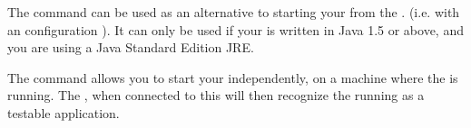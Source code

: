 


The  command can be used as an alternative to starting your \gdaut{} from the \ite{}. 
(i.e. with an \gdaut{} configuration ). 
It can only be used if your \gdaut{} is written in Java 1.5 or above, and you are using a Java Standard Edition JRE. 



The command allows you to start your \gdaut{} independently, on a machine where the \gdagent{} is running. The  \ite{}, when connected to this \gdagent{} will then recognize the running \gdaut{} as a testable application. 

